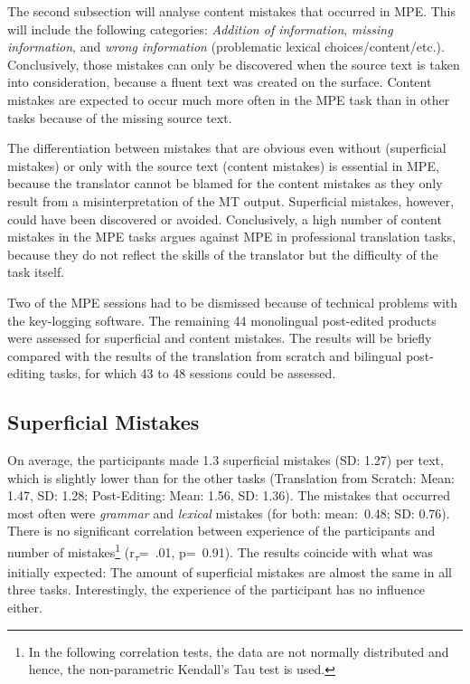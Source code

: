 \documentclass[output=paper]{langsci/langscibook}
\begin{document}
The second subsection will analyse content mistakes that occurred in MPE. This will include the following categories: \textit{Addition of information}, \textit{missing information}, and \textit{wrong information} (problematic lexical choices/content/etc.). Conclusively, those mistakes can only be discovered when the source text is taken into consideration, because a fluent text was created on the surface. Content mistakes are expected to occur much more often in the MPE task than in other tasks because of the missing source text.



The differentiation between mistakes that are obvious even without (superficial mistakes) or only with the source text (content mistakes) is essential in MPE, because the translator cannot be blamed for the content mistakes as they only result from a misinterpretation of the MT output. Superficial mistakes, however, could have been discovered or avoided. Conclusively, a high number of content mistakes in the MPE tasks argues against MPE in professional translation tasks, because they do not reflect the skills of the translator but the difficulty of the task itself.



Two of the MPE sessions had to be dismissed because of technical problems with the key-logging software. The remaining 44 monolingual post-edited products were assessed for superficial and content mistakes. The results will be briefly compared with the results of the translation from scratch and bilingual post-editing tasks, for which 43 to 48 sessions could be assessed.


\subsection{Superficial Mistakes\label{nitzke:sec:SuperficialMistakes}}

On average, the participants made 1.3 superficial mistakes (SD: 1.27) per text, which is slightly lower than for the other tasks (Translation from Scratch: Mean: 1.47, SD: 1.28; Post-Editing: Mean: 1.56, SD: 1.36). The mistakes that occurred most often were \textit{grammar} and \textit{lexical} mistakes (for both: mean:~0.48; SD: 0.76). There is no significant correlation between experience of the participants and number of mistakes\footnote{In the following correlation tests, the data are not normally distributed and hence, the non-parametric Kendall's Tau test is used.} (r\textsubscript{$\tau $}=~.01, p=~0.91). The results coincide with what was initially expected: The amount of superficial mistakes are almost the same in all three tasks. Interestingly, the experience of the participant has no influence either.
\end{document}
